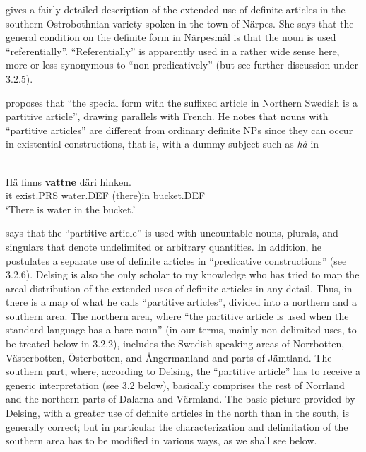 
\citet{Nikula1997} gives a fairly detailed description of the extended use of definite articles in the southern Ostrobothnian variety spoken in the town of Närpes. She says that the general condition on the definite form in Närpesmål is that the noun is used “referentially”. “Referentially” is apparently used in a rather wide sense here, more or less synonymous to “non-predicatively” (but see further discussion under 3.2.5). 


\citet[50]{Delsing1993} proposes that “the special form with the suffixed article in Northern Swedish is a partitive article”, drawing parallels with French. He notes that nouns with “partitive articles” are different from ordinary definite NPs since they can occur in existential constructions, that is, with a dummy subject such as \textit{hä} in 


\ea\label{}
\\
	\gll	Hä  finns  \textbf{vattne} däri  hinken.\\
			it  exist.PRS  water.DEF  (there)in  bucket.DEF\\
			
	\glt ‘There is water in the bucket.’
\z

\citet[15]{Delsing2003a} says that the “partitive article” is used with uncountable nouns, plurals, and singulars that denote undelimited or arbitrary quantities. In addition, he postulates a separate use of definite articles in “predicative constructions” (see 3.2.6). Delsing is also the only scholar to my knowledge who has tried to map the areal distribution of the extended uses of definite articles in any detail. Thus, in \citet[18]{Delsing2003a} there is a map of what he calls “partitive articles”, divided into a northern and a southern area. The northern area, where “the partitive article is used when the standard language has a bare noun” (in our terms, mainly non-delimited uses, to be treated below in 3.2.2), includes the Swedish-speaking areas of Norrbotten, Västerbotten, Österbotten, and Ångermanland and parts of Jämtland. The southern part, where, according to Delsing, the “partitive article” has to receive a generic interpretation (see 3.2 below), basically comprises the rest of Norrland and the northern parts of Dalarna and Värmland. The basic picture provided by Delsing, with a greater use of definite articles in the north than in the south, is generally correct; but in particular the characterization and delimitation of the southern area has to be modified in various ways, as we shall see below. 

